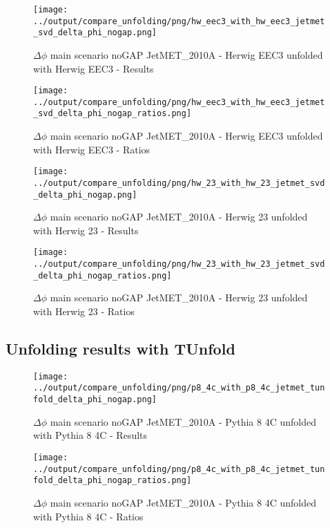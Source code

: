 \documentclass[11pt]{book}
\begin{document}
\begin{figure}[ht]
\centering
\texttt{[image: ../output/compare\_unfolding/png/hw\_eec3\_with\_hw\_eec3\_jetmet\_svd\_delta\_phi\_nogap.png]}
\caption{$\Delta\phi$ main scenario noGAP JetMET\_2010A - Herwig EEC3 unfolded with Herwig EEC3 - Results}
\label{hw_eec3_hw_eec3_jetmet_svd_delta_phi_nogap_a}
\end{figure}

\begin{figure}[ht]
\centering
\texttt{[image: ../output/compare\_unfolding/png/hw\_eec3\_with\_hw\_eec3\_jetmet\_svd\_delta\_phi\_nogap\_ratios.png]}
\caption{$\Delta\phi$ main scenario noGAP JetMET\_2010A - Herwig EEC3 unfolded with Herwig EEC3 - Ratios}
\label{hw_eec3_hw_eec3_jetmet_svd_delta_phi_nogap_b}
\end{figure}

\begin{figure}[ht]
\centering
\texttt{[image: ../output/compare\_unfolding/png/hw\_23\_with\_hw\_23\_jetmet\_svd\_delta\_phi\_nogap.png]}
\caption{$\Delta\phi$ main scenario noGAP JetMET\_2010A - Herwig 23 unfolded with Herwig 23 - Results}
\label{hw_23_hw_23_jetmet_svd_delta_phi_nogap_a}
\end{figure}

\begin{figure}[ht]
\centering
\texttt{[image: ../output/compare\_unfolding/png/hw\_23\_with\_hw\_23\_jetmet\_svd\_delta\_phi\_nogap\_ratios.png]}
\caption{$\Delta\phi$ main scenario noGAP JetMET\_2010A - Herwig 23 unfolded with Herwig 23 - Ratios}
\label{hw_23_hw_23_jetmet_svd_delta_phi_nogap_b}
\end{figure}


\clearpage
\subsection{Unfolding results with TUnfold}

\begin{figure}[ht]
\centering
\texttt{[image: ../output/compare\_unfolding/png/p8\_4c\_with\_p8\_4c\_jetmet\_tunfold\_delta\_phi\_nogap.png]}
\caption{$\Delta\phi$ main scenario noGAP JetMET\_2010A - Pythia 8 4C unfolded with Pythia 8 4C - Results}
\label{p8_p8_jetmet_tunfold_delta_phi_nogap_a}
\end{figure}

\begin{figure}[ht]
\centering
\texttt{[image: ../output/compare\_unfolding/png/p8\_4c\_with\_p8\_4c\_jetmet\_tunfold\_delta\_phi\_nogap\_ratios.png]}
\caption{$\Delta\phi$ main scenario noGAP JetMET\_2010A - Pythia 8 4C unfolded with Pythia 8 4C - Ratios}
\label{p8_p8_jetmet_tunfold_delta_phi_nogap_b}
\end{figure}
\end{document}
